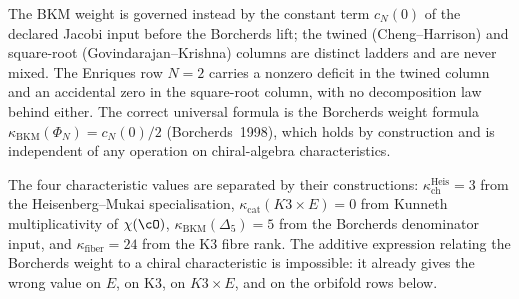 \begin{remark}
The BKM weight is governed instead by the constant term $c_N(0)$ of the declared Jacobi input before the Borcherds lift; the twined (Cheng--Harrison) and square-root (Govindarajan--Krishna) columns are distinct ladders and are never mixed.
The Enriques row $N = 2$ carries a nonzero deficit in the twined column and an accidental zero in the square-root column, with no decomposition law behind either.
The correct universal formula is the Borcherds weight formula $\kappa_{\mathrm{BKM}}(\Phi_N) = c_N(0)/2$ (Borcherds~1998), which holds by construction and is independent of any operation on chiral-algebra characteristics.
\end{remark}

\noindent
The four characteristic values are separated by their constructions:
\(\kappa_{\mathrm{ch}}^{\mathrm{Heis}}=3\) from the Heisenberg--Mukai
specialisation, \(\kappa_{\mathrm{cat}}(K3\times E)=0\) from
Kunneth multiplicativity of \(\chi(\cO)\),
\(\kappa_{\mathrm{BKM}}(\Delta_5)=5\) from the Borcherds denominator
input, and \(\kappa_{\mathrm{fiber}}=24\) from the K3 fibre rank. The
additive expression relating the Borcherds weight to a chiral
characteristic is impossible: it already gives the wrong value on
\(E\), on K3, on \(K3\times E\), and on the orbifold rows below.

